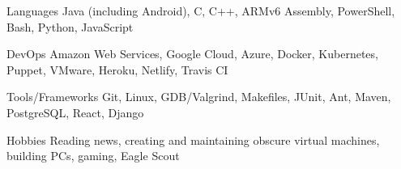 

\begin{cvskills}


  \cvskill
    {Languages} %
    {Java (including Android), C, C++, ARMv6 Assembly, PowerShell, Bash, Python, JavaScript} %

  \cvskill
    {DevOps} %
    {Amazon Web Services, Google Cloud, Azure, Docker, Kubernetes, Puppet, VMware, Heroku, Netlify, Travis CI} %
    
  \cvskill
    {Tools/Frameworks} %
    {Git, Linux, GDB/Valgrind, Makefiles, JUnit, Ant, Maven, PostgreSQL, React, Django} %

  \cvskill
  {Hobbies} %
  {Reading news, creating and maintaining obscure virtual machines, building PCs, gaming, Eagle Scout} %

\end{cvskills}
